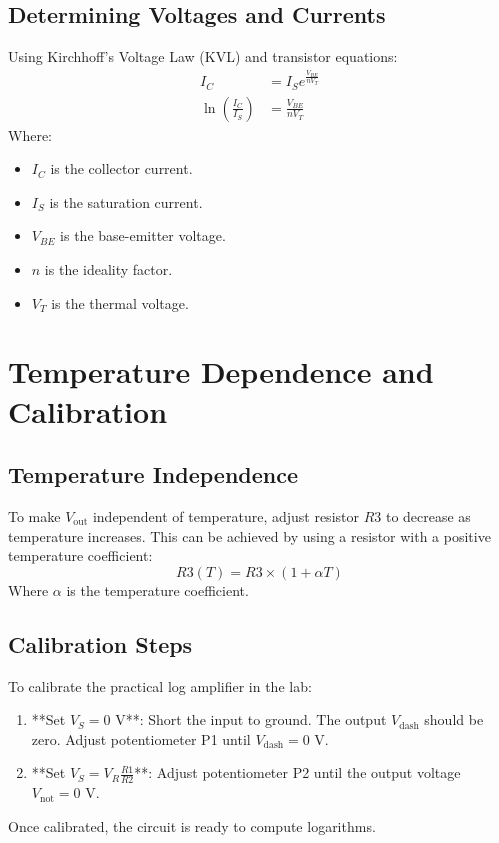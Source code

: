 \subsection{Determining Voltages and Currents}

Using Kirchhoff's Voltage Law (KVL) and transistor equations:
\begin{align}
    I_C &= I_S e^{\frac{V_{BE}}{n V_T}} \\
    \ln\left(\frac{I_C}{I_S}\right) &= \frac{V_{BE}}{n V_T}
\end{align}
Where:
\begin{itemize}
    \item \( I_C \) is the collector current.
    \item \( I_S \) is the saturation current.
    \item \( V_{BE} \) is the base-emitter voltage.
    \item \( n \) is the ideality factor.
    \item \( V_T \) is the thermal voltage.
\end{itemize}

\section{Temperature Dependence and Calibration}

\subsection{Temperature Independence}

To make \( V_{\text{out}} \) independent of temperature, adjust resistor \( R3 \) to decrease as temperature increases. This can be achieved by using a resistor with a positive temperature coefficient:
\[
R3(T) = R3 \times (1 + \alpha T)
\]
Where \( \alpha \) is the temperature coefficient.

\subsection{Calibration Steps}

To calibrate the practical log amplifier in the lab:
\begin{enumerate}
    \item **Set \( V_S = 0 \text{ V} \)**: Short the input to ground. The output \( V_{\text{dash}} \) should be zero. Adjust potentiometer P1 until \( V_{\text{dash}} = 0 \text{ V} \).
    \item **Set \( V_S = V_R \frac{R1}{R2} \)**: Adjust potentiometer P2 until the output voltage \( V_{\text{not}} = 0 \text{ V} \).
\end{enumerate}
Once calibrated, the circuit is ready to compute logarithms.

